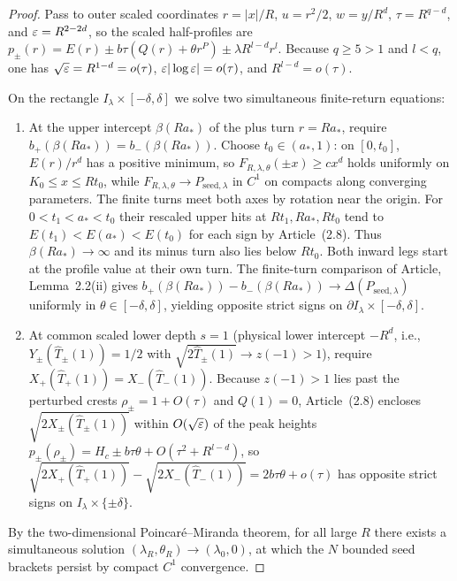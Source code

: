 \begin{proof}
Pass to outer scaled coordinates $r=|x|/R$, $u=r^2/2$, $w=y/R^d$, $\tau=R^{q-d}$, and $\varepsilon=R^{2-2d}$,
so the scaled half-profiles are $p_\pm(r)=E(r)\pm b\tau(Q(r)+\theta r^P)\pm\lambda R^{l-d}r^l$.
Because $q\ge 5>1$ and $l<q$, one has $\sqrt{\varepsilon}=R^{1-d}=o(\tau)$, $\varepsilon|\log\varepsilon|=o(\tau)$, and
$R^{l-d}=o(\tau)$.

On the rectangle $I_\lambda\times[-\delta,\delta]$ we solve two simultaneous finite-return equations:
\begin{enumerate}
  \item At the upper intercept $\beta(R a_*)$ of the plus turn $r=Ra_*$, require
  $b_+(\beta(Ra_*))=b_-(\beta(Ra_*))$. Choose $t_0\in(a_*,1)$: on $[0,t_0]$, $E(r)/r^d$ has a positive
  minimum, so $F_{R,\lambda,\theta}(\pm x)\ge c x^d$ holds uniformly on $K_0\le x\le R t_0$, while
  $F_{R,\lambda,\theta}\to P_{\mathrm{seed},\lambda}$ in $C^1$ on compacts along converging parameters. The finite turns meet both axes
  by rotation near the origin. For $0<t_1<a_*<t_0$ their rescaled upper hits
  at $Rt_1,Ra_*,Rt_0$ tend to $E(t_1)<E(a_*)<E(t_0)$ for each sign by
  Article~(2.8). Thus $\beta(Ra_*)\to\infty$ and its minus
  turn also lies below $Rt_0$. Both inward legs start at the profile
  value at their own turn. The finite-turn comparison of Article, Lemma~2.2(ii)
  gives $b_+(\beta(Ra_*))-b_-(\beta(Ra_*))\to\Delta(P_{\mathrm{seed},\lambda})$ uniformly in
  $\theta\in[-\delta,\delta]$, yielding opposite strict signs on $\partial
  I_\lambda\times[-\delta,\delta]$.
  \item At common scaled lower depth $s=1$ (physical lower intercept $-R^d$, i.e., $Y_\pm(\widehat
  T_\pm(1))=1/2$ with $\sqrt{2\widehat T_\pm(1)}\to z(-1)>1$), require $X_+(\widehat
  T_+(1))=X_-(\widehat T_-(1))$. Because $z(-1)>1$ lies past the perturbed crests $\rho_\pm=1+O(\tau)$
  and $Q(1)=0$, Article~(2.8) encloses $\sqrt{2X_\pm(\widehat T_\pm(1))}$ within
  $O(\sqrt{\varepsilon})$ of the peak heights $p_\pm(\rho_\pm)=H_c\pm b\tau\theta+O(\tau^2+R^{l-d})$, so
  $\sqrt{2X_+(\widehat T_+(1))}-\sqrt{2X_-(\widehat T_-(1))}=2b\tau\theta+o(\tau)$ has opposite strict
  signs on $I_\lambda\times\{\pm\delta\}$.
\end{enumerate}
By the two-dimensional Poincar\'e--Miranda theorem, for all large $R$ there exists a simultaneous
solution $(\lambda_R,\theta_R)\to(\lambda_0,0)$, at which the $N$ bounded seed brackets persist by
compact $C^1$ convergence.


\end{proof}
